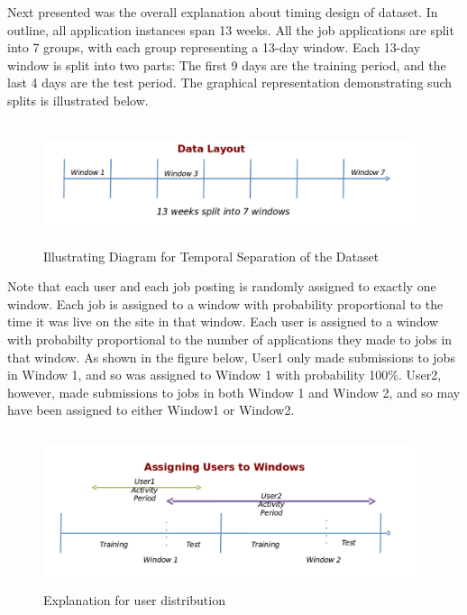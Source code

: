 \documentclass{article} %
\begin{document}
Next presented was the overall explanation about timing design of dataset. In
outline, all application instances span 13 weeks. All the job applications are
split into 7 groups, with each group representing a 13-day window. Each 13-day
window is split into two parts: The first 9 days are the training period, and
the last 4 days are the test period. The graphical representation
demonstrating such splits is illustrated below.
\begin{figure}[h]
    \begin{center}
        \includegraphics[width=4.3in,height=1.4in]{./fig/datalayout.png}
        \caption{Illustrating Diagram for Temporal Separation of the Dataset}
    \end{center}
\end{figure}

Note that each user and each job posting is randomly assigned to exactly one window.
Each job is assigned to a window with probability proportional to the time it
was live on the site in that window. Each user is assigned to a window with
probabilty proportional to the number of applications they made to jobs in
that window. As shown in the figure below, User1 only made submissions to jobs in
Window 1, and so was assigned to Window 1 with probability 100\%. User2,
however, made submissions to jobs in both Window 1 and Window 2, and so may
have been assigned to either Window1 or Window2.

\begin{figure}[h]
    \begin{center}
        \includegraphics[width=4.3in,height=1.8in]{./fig/assignusertowindows.png}
        \caption{Explanation for user distribution}
    \end{center}
\end{figure}
\end{document}
